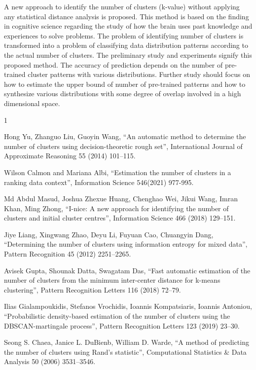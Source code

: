 \documentclass[lettersize,journal]{IEEEtran}
\begin{document}
A new approach to identify the number of clusters (k-value) without applying any statistical distance 
analysis is proposed. This method is based on the finding in cognitive science regarding the study of how 
the brain uses past knowledge and experiences to solve problems. The problem of identifying number of
clusters is transformed into a problem of classifying data distribution patterns according to the
actual number of clusters.  The preliminary study and experiments signify this proposed method.
The accuracy of prediction depends on the number of pre-trained cluster patterns with various 
distributions. Further study should focus on how to estimate the upper bound of number of pre-trained 
patterns and how to synthesize various distributions with some degree of overlap involved in a high 
dimensional space.

\begin{thebibliography}{1}


Hong Yu, Zhanguo Liu, Guoyin Wang, ``An automatic method to determine the number of clusters using
decision-theoretic rough set'', International Journal of Approximate Reasoning 55 (2014) 101–115.

Wilson Calmon and Mariana Albi, ``Estimation the number of clusters in a ranking data context'', Information Science
546(2021) 977-995.

Md Abdul Masud, Joshua Zhexue Huang, Chenghao Wei, Jikui Wang, Imran Khan, Ming Zhong, ``I-nice: A new approach 
for identifying the number of clusters and initial cluster centres'', Information Science 466 (2018) 129–151.

Jiye Liang, Xingwang Zhao, Deyu Li, Fuyuan Cao, Chuangyin Dang, ``Determining the number of clusters using 
information entropy for mixed data'', Pattern Recognition 45 (2012) 2251–2265.

Avisek Gupta, Shounak Datta, Swagatam Das, ``Fast automatic estimation of the number of clusters from the
minimum inter-center distance for k-means clustering'', Pattern Recognition Letters 116 (2018) 72–79.

Ilias Gialampoukidis, Stefanos Vrochidis, Ioannis Kompatsiaris, Ioannis Antoniou, ``Probabilistic 
density-based estimation of the number of clusters using the DBSCAN-martingale process'', Pattern 
Recognition Letters 123 (2019) 23–30.

Seong S. Chaea, Janice L. DuBienb, William D. Warde, ``A method of predicting the number of clusters 
using Rand’s statistic'', Computational Statistics \& Data Analysis 50 (2006) 3531–3546.


\end{thebibliography}
\end{document}
